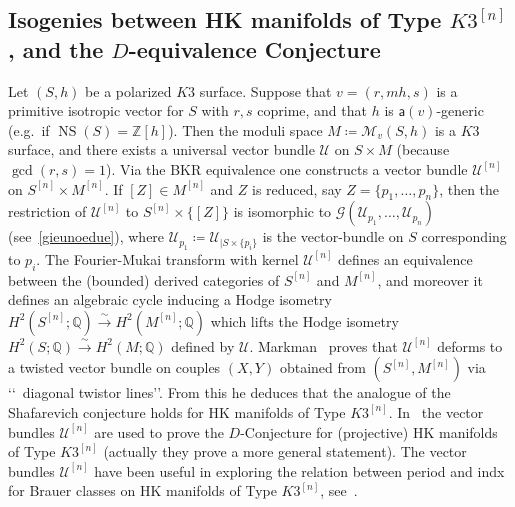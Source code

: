 \documentclass[11pt]{amsart}
\newcommand{\QQ}{{\mathbb Q}}
\newcommand{\ZZ}{{\mathbb Z}}
\let\mathcal\mathscr
\def\cG{\mathcal{G}}
\def\cM{\mathcal{M}}
\def\cU{\mathcal{U}}
\DeclareMathOperator{\NS}{NS}
\theoremstyle{definition}
\theoremstyle{remark}
\begin{document}
\subsection{Isogenies between HK manifolds of Type $K3^{[n]}$, and the $D$-equivalence Conjecture}
%
%
\setcounter{equation}{0}
%

Let $(S,h)$ be a polarized  $K3$ surface. Suppose that  $v=(r,mh,s)$ is a primitive isotropic vector for $S$ with $r,s$ coprime, and that $h$ is ${\mathsf a}(v)$-generic (e.g.~if $\NS(S)=\ZZ [h]$). Then the moduli space $M\coloneqq \cM_v(S,h)$ is a $K3$ surface, and there exists a universal vector bundle $\cU$ on  $S\times M$ (because 
$\gcd(r,s)=1$). Via the BKR equivalence one constructs a vector bundle $\cU^{[n]}$ on $S^{[n]}\times M^{[n]}$. If $[Z]\in M^{[n]}$ and $Z$ is reduced, say $Z=\{p_1,\ldots,p_n\}$, then  the restriction of $\cU^{[n]}$ to $S^{[n]}\times\{[Z]\}$ is isomorphic to $\cG(\cU_{p_1},\ldots,\cU_{p_n})$ (see~\eqref{gieunoedue}), where $\cU_{p_1}\coloneqq \cU_{|S\times\{p_i\}}$ is the vector-bundle on $S$ corresponding to $p_i$.  The Fourier-Mukai transform with kernel  $\cU^{[n]}$ defines an equivalence between the (bounded) derived categories of $S^{[n]}$ and $M^{[n]}$, and moreover it defines an algebraic cycle inducing a Hodge isometry $H^2(S^{[n]};\QQ)\xrightarrow{\sim} H^2(M^{[n]};\QQ)$ which lifts the 
Hodge isometry $H^2(S;\QQ)\xrightarrow{\sim} H^2(M;\QQ)$ defined by $\cU$.
Markman~\cite{markman:hodgeisom} proves that $\cU^{[n]}$ deforms to a twisted vector bundle on couples $(X,Y)$ obtained from 
$(S^{[n]},M^{[n]})$ via \lq\lq\ diagonal twistor lines\rq\rq. From this he deduces that the analogue of the Shafarevich conjecture holds for HK manifolds of Type $K3^{[n]}$. In~\cite{mauliketalii:diequivalenza} the vector bundles $\cU^{[n]}$ are used to prove the $D$-Conjecture for (projective) HK manifolds of Type $K3^{[n]}$ (actually they prove a more general statement). The vector bundles  $\cU^{[n]}$ have been useful in 
exploring the relation between period and indx for Brauer classes on HK manifolds of Type $K3^{[n]}$, see~\cite{hmsyz:per-index-type-k3n}.
%
\end{document}
